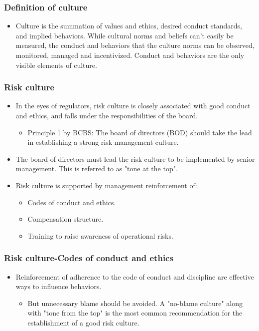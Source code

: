 \subsubsection{Definition of culture}


\begin{itemize}
\item Culture is the summation of values and ethics, desired conduct standards, and implied behaviors. While cultural norms and beliefs can't easily be measured, the conduct and behaviors that the culture norms can be observed, monitored, managed and incentivized. Conduct and behaviors are the only visible elements of culture.
\end{itemize}



\subsubsection{Risk culture}

\begin{itemize}
\item In the eyes of regulators, risk culture is closely associated with good conduct and ethics, and falls under the responsibilities of the board.
    \begin{itemize}
    \item Principle 1 by BCBS: The board of directors (BOD) should take the lead in establishing a strong risk management culture.
    \end{itemize}
\item The board of directors must lead the risk culture to be implemented by senior management. This is referred to as "tone at the top".
\item  Risk culture is supported by management reinforcement of:
    \begin{itemize}
    \item Codes of conduct and ethics.
    \item Compensation structure.
    \item Training to raise awareness of operational risks.
    \end{itemize}
\end{itemize}

\subsubsection{Risk culture-Codes of conduct and ethics}

\begin{itemize}
\item Reinforcement of adherence to the code of conduct and discipline are effective ways to influence behaviors.
    \begin{itemize}
    \item  But unnecessary blame should be avoided. A "no-blame culture" along with "tone from the top" is the most common recommendation for the establishment of a good risk culture.
    \end{itemize}
\end{itemize}

